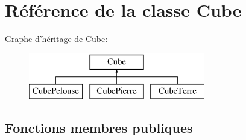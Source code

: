 \hypertarget{classCube}{\section{Référence de la classe Cube}
\label{classCube}
}
Graphe d'héritage de Cube\-:\begin{figure}[H]
\begin{center}
\leavevmode
\includegraphics[height=2.000000cm]{classCube}
\end{center}
\end{figure}
\subsection*{Fonctions membres publiques}
